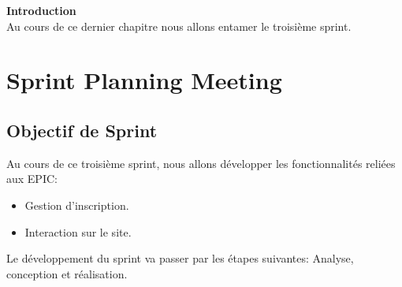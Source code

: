 \textbf{Introduction}\\
Au cours de ce dernier chapitre nous allons entamer le troisième sprint. 
\section{Sprint Planning Meeting}
\subsection{Objectif de Sprint}
Au cours de ce troisième sprint, nous allons développer les fonctionnalités reliées aux EPIC:
\begin{itemize}
	\item Gestion d'inscription. 
	\item Interaction sur le site.
\end{itemize}
Le développement du sprint va passer par les étapes suivantes: Analyse, conception et réalisation.

